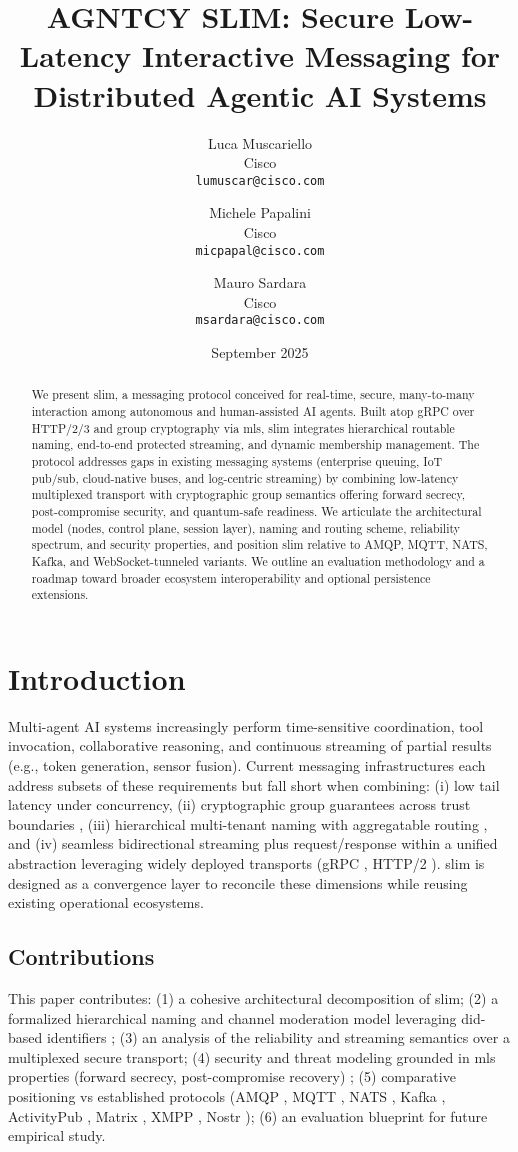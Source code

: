 \documentclass{article}
\title{AGNTCY SLIM: Secure Low-Latency Interactive Messaging for Distributed Agentic AI Systems}
\author{Luca Muscariello \\ Cisco \\ \texttt{lumuscar@cisco.com}
  \and Michele Papalini \\ Cisco \\ \texttt{micpapal@cisco.com}
  \and Mauro Sardara \\ Cisco \\ \texttt{msardara@cisco.com}}
\date{September 2025}
\newcommand{\HTTP}{HTTP/2\slash3}
\theoremstyle{definition}
\theoremstyle{remark}
\begin{document}
\maketitle
\begin{abstract}
We present \gls{slim}, a messaging protocol conceived for real-time, secure, many-to-many interaction among autonomous and human-assisted AI agents. Built atop gRPC over \HTTP{} and group cryptography via \gls{mls}, \gls{slim} integrates hierarchical routable naming, end-to-end protected streaming, and dynamic membership management. The protocol addresses gaps in existing messaging systems (enterprise queuing, IoT pub/sub, cloud-native buses, and log-centric streaming) by combining low-latency multiplexed transport with cryptographic group semantics offering forward secrecy, post-compromise security, and quantum-safe readiness. We articulate the architectural model (nodes, control plane, session layer), naming and routing scheme, reliability spectrum, and security properties, and position \gls{slim} relative to AMQP, MQTT, NATS, Kafka, and WebSocket-tunneled variants. We outline an evaluation methodology and a roadmap toward broader ecosystem interoperability and optional persistence extensions.
\end{abstract}


\section{Introduction}\label{sec:intro}
Multi-agent AI systems increasingly perform time-sensitive coordination, tool invocation, collaborative reasoning, and continuous streaming of partial results (e.g., token generation, sensor fusion). Current messaging infrastructures each address subsets of these requirements but fall short when combining: (i) low tail latency under concurrency, (ii) cryptographic group guarantees across trust boundaries \citep{rfc9420,rfc9750}, (iii) hierarchical multi-tenant naming with aggregatable routing \citep{rfc6920,didcore}, and (iv) seamless bidirectional streaming plus request/response within a unified abstraction leveraging widely deployed transports (gRPC \citep{grpc}, HTTP/2 \citep{http2}). \gls{slim} is designed as a convergence layer to reconcile these dimensions while reusing existing operational ecosystems.

\subsection{Contributions}
This paper contributes: (1) a cohesive architectural decomposition of \gls{slim}; (2) a formalized hierarchical naming and channel moderation model leveraging \gls{did}-based identifiers \citep{didcore,didmethods,didkey}; (3) an analysis of the reliability and streaming semantics over a multiplexed secure transport; (4) security and threat modeling grounded in \gls{mls} properties (forward secrecy, post-compromise recovery) \citep{rfc9420,rfc9750}; (5) comparative positioning vs established protocols (AMQP \citep{amqp10}, MQTT \citep{mqtt311}, NATS \citep{nats}, Kafka \citep{kafka}, ActivityPub \citep{activitypub}, Matrix \citep{matrixspec}, XMPP \citep{xmpp-core}, Nostr \citep{nostr}); (6) an evaluation blueprint for future empirical study.
\end{document}

